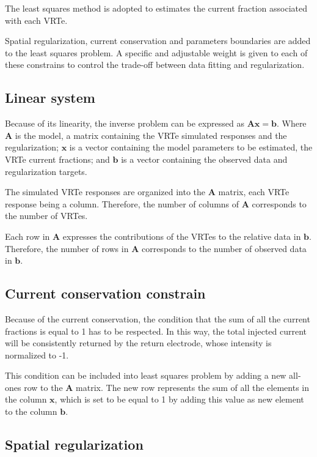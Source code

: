 \documentclass{article}
\begin{document}
The least squares method is adopted to estimates the current fraction associated with each VRTe.

Spatial regularization, current conservation and parameters boundaries are added to the least squares problem. A specific and adjustable weight is given to each of these constrains to control the trade-off between data fitting and regularization.

\subsection{Linear system}

Because of its linearity, the inverse problem can be expressed as $\bm{Ax=b}$. Where $\bm{A}$ is the model, a matrix containing the VRTe simulated responses and the regularization; $\bm{x}$ is a vector containing the model parameters to be estimated, the VRTe current fractions; and $\bm{b}$ is a vector containing the observed data and regularization targets.

The simulated VRTe responses are organized into the $\bm{A}$ matrix, each VRTe response being a column. Therefore, the number of columns of $\bm{A}$ corresponds to the number of VRTes.

Each row in $\bm{A}$ expresses the contributions of the VRTes to the relative data in $\bm{b}$. Therefore, the number of rows in $\bm{A}$ corresponds to the number of observed data in $\bm{b}$.

\subsection{Current conservation constrain}

Because of the current conservation, the condition that the sum of all the current fractions is equal to 1 has to be respected. In this way, the total injected current will be consistently returned by the return electrode, whose intensity is normalized to -1.

This condition can be included into least squares problem by adding a new all-ones row to the $\bm{A}$ matrix. The new row represents the sum of all the elements in the column $\bm{x}$, which is set to be equal to 1 by adding this value as new element to the column $\bm{b}$.

\subsection{Spatial regularization}
\end{document}
